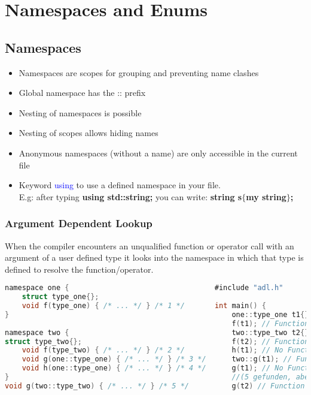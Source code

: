 
\section{Namespaces and Enums}

\subsection{Namespaces}
\begin{itemize}
    \item Namespaces are scopes for grouping and preventing name clashes
    \item Global namespace has the :: prefix
    \item Nesting of namespaces is possible
    \item Nesting of scopes allows hiding names
    \item Anonymous namespaces (without a name) are only accessible in the current file
    \item Keyword \textcolor{blue}{using} to use a defined namespace in your file.\\
    E.g: after typing \textbf{using std::string;} you can write: \textbf{string s$\{$\dq my string\dq$\}$;}
\end{itemize}

\subsubsection{Argument Dependent Lookup}
When the compiler encounters an unqualified function or operator call with an argument of a user defined type it looks into the namespace in which that type is defined to resolve the function/operator.
\begin{lstlisting}[style=frame, style= linenumbers, language=C]
namespace one {                                  #include "adl.h"
    struct type_one{};
    void f(type_one) { /* ... */ } /* 1 */       int main() {
}                                                    one::type_one t1{};
                                                     f(t1); // Function 1
namespace two {                                      two::type_two t2{};
struct type_two{};                                   f(t2); // Function 2
    void f(type_two) { /* ... */ } /* 2 */           h(t1); // No Function found
    void g(one::type_one) { /* ... */ } /* 3 */      two::g(t1); // Function 3
    void h(one::type_one) { /* ... */ } /* 4 */      g(t1); // No Function found
}                                                    //(5 gefunden, aber arg passt nicht)
void g(two::type_two) { /* ... */ } /* 5 */          g(t2) // Function 5
\end{lstlisting}

